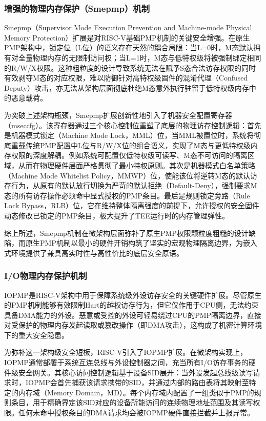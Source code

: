 \documentclass[master, vlined, review]{DissertUESTC}
\begin{document}
	\subsubsection{增强的物理内存保护（Smepmp）机制}
	Smepmp（Supervisor Mode Execution Prevention and Machine-mode Physical Memory Protection）扩展是对RISC-V基础PMP机制的关键安全增强。在原生PMP架构中，锁定位（L位）的语义存在天然的耦合局限：当L=0时，M态默认拥有对全量物理内存的无限制访问权；当L=1时，M态与低特权级将被强制绑定相同的R/W/X权限。这种粗粒度的设计导致系统无法在赋予S态合法访存权限的同时有效剥夺M态的对应权限，难以防御针对高特权级固件的混淆代理（Confused Deputy）攻击，亦无法从架构层面彻底杜绝M态意外执行驻留于低特权级内存中的恶意载荷。
	
	为突破上述架构瓶颈，Smepmp扩展创新性地引入了机器安全配置寄存器（mseccfg）。该寄存器通过三个核心控制位重塑了底层的物理访存控制逻辑：首先是机器模式锁定（Machine Mode Lock，MML）位，当MML被置位时，系统将彻底重载传统PMP配置中L位与R/W/X位的组合语义，实现了M态与更低特权级内存权限的深度解耦。例如系统可配置仅低特权级可读写、M态不可访问的隔离区域，从而在物理硬件层面严格贯彻了最小特权原则。其次是机器模式白名单策略（Machine Mode Whitelist Policy，MMWP）位，使能该位将逆转M态的默认访存行为，从原有的默认放行切换为严苛的默认拒绝（Default-Deny），强制要求M态的所有访存操作必须命中显式授权的PMP条目。最后是规则锁定旁路（Rule Lock Bypass，RLB）位，它在维持整体隔离强度的前提下，允许授权的安全固件动态修改已锁定的PMP条目，极大提升了TEE运行时的内存管理弹性。
	
	综上所述，Smepmp机制在微架构层面弥补了原生PMP权限颗粒度粗糙的设计缺陷，而原生PMP机制以最小的硬件开销构筑了坚实的宏观物理隔离边界，为嵌入式环境提供了兼具高实时性与高性价比的底层安全原语。
	
	\subsubsection{I/O物理内存保护机制}
	IOPMP是RISC-V架构中用于保障系统级外设访存安全的关键硬件扩展。尽管原生的PMP机制能够有效限制Hart的越权访存行为，但它仅作用于CPU侧，无法约束具备DMA能力的外设。恶意或受控的外设可轻易绕过CPU的PMP隔离边界，直接对受保护的物理内存发起读取或篡改操作（即DMA攻击），这构成了机密计算环境下的重大安全隐患。
	
	为弥补这一架构级安全短板，RISC-V引入了IOPMP扩展。在微架构实现上，IOPMP通常部署于系统互连总线与外设控制器之间，充当所有I/O访存事务的硬件级安全网关。其核心访问控制逻辑基于设备SID展开：当外设发起总线级读写请求时，IOPMP会首先捕获该请求携带的SID，并通过内部的路由表将其映射至特定的内存域（Memory Domain，MD）。每个内存域内配置了一组类似于PMP的规则条目，用于精确界定该SID对应的设备所能访问的连续物理地址范围及其读写权限。任何未命中授权条目的DMA请求均会被IOPMP硬件直接拦截并上报异常。
	
\end{document}
